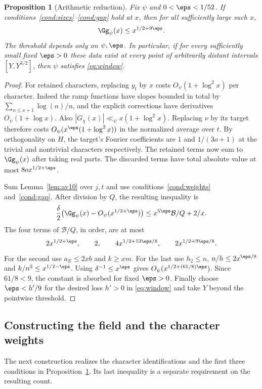 \documentclass[a4paper,11pt]{article}
\newtheorem{proposition}{Proposition}[section]
\theoremstyle{definition}
\theoremstyle{remark}
\numberwithin{equation}{section}
\begin{document}
\begin{proposition}[Arithmetic reduction]\label{prop:balance}
Fix \(\psi\) and \(0<\eps<1/52\). If conditions~\ref{cond:sizes}--\ref{cond:gap} hold at \(x\), then for all sufficiently large such \(x\),
\[
                         \Gg_\psi(x)\le x^{1/2+9\eps}.
\]
The threshold depends only on \(\psi,\eps\). In particular, if for every sufficiently small fixed \(\eps>0\) these data exist at every point of arbitrarily distant intervals \([Y,Y^{3/2}]\), then \(\psi\) satisfies \eqref{eq:window}.
\end{proposition}
\begin{proof}
For retained characters, replacing \(y_t\) by \(x\) costs \(O_\psi(1+\log^2x)\) per character. Indeed the ramp functions have slopes bounded in total by \(\sum_{n\le x+1}\log(n)/n\), and the explicit corrections have derivatives \(O_\psi(1+\log x)\). Also \(|G_\chi(x)|\ll_\psi x(1+\log^2x)\). Replacing \(\nu\) by its target therefore costs \(O_\psi(x^\eps(1+\log^2x))\) in the normalized average over \(t\). By orthogonality on \(H\), the target's Fourier coefficients are \(1\) and \(1/(3o+1)\) at the trivial and nontrivial characters respectively. The retained terms now sum to \(\Gg_\psi(x)\) after taking real parts. The discarded terms have total absolute value at most \(8o x^{1/2+\eps}\).

Sum Lemma~\ref{lem:av10} over \(j,t\) and use conditions~\ref{cond:weights} and~\ref{cond:gap}. After division by \(Q\), the resulting inequality is
\[
 \frac{\delta}{2}\big(\Gg_\psi(x)-O_\psi(x^{1/2+\eps})\big)
                       \le x^{5\eps}\mathcal B/Q+2/x .
\]
The four terms of \(\mathcal B/Q\), in order, are at most
\[
  2x^{1/2+\eps},\qquad 2,\qquad
  4x^{1/2+13\eps/8},\qquad 2x^{1/2+9\eps/8}.
\]
For the second use \(a_E\le2xb\) and \(k\ge xm\). For the last use \(h_2\le n\), \(n/h\le2x^{\eps/8}\) and \(k/n^2\le x^{1/2-\eps}\). Using \(\delta^{-1}\le x^\eps\) gives \(O_\psi(x^{1/2+(61/8)\eps})\). Since \(61/8<9\), the constant is absorbed for fixed \(\eps>0\). Finally choose \(\eps<h'/9\) for the desired loss \(h'>0\) in \eqref{eq:window} and take \(Y\) beyond the pointwise threshold.
\end{proof}

\subsection{Constructing the field and the character weights}\label{nav:I-25}
\label{sec:field12}
The next construction realizes the character identifications and the first three conditions in Proposition~\ref{prop:balance}. Its last inequality is a separate requirement on the resulting count.
\end{document}
